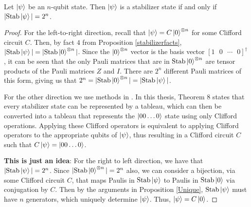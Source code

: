 \documentclass[12pt]{dalthesis}
\begin{document}
\begin{theorem}
\label{stabstate}
Let $\ket{\psi}$ be an $n$-qubit state. Then $\ket{\psi}$ is a stabilizer state if and only if $|\mathrm{Stab} \ket{\psi}| = 2^n$. 
\end{theorem}
\begin{proof}
For the left-to-right direction, recall that $\ket{\psi} = C\ket{0}^{\otimes n}$ for some Clifford circuit $C$. Then, by fact $4$ from Proposition \ref{stabilizerfacts}, $|\mathrm{Stab} \ket{\psi}| = |\mathrm{Stab} \ket{0}^{\otimes n}|$. Since the $\ket{0}^{\otimes n}$ vector is the basis vector $[1 \mbox{ } 0 \mbox{ } \cdots \mbox{ } 0]^\dagger$, it can be seen that the only Pauli matrices that are in $\mathrm{Stab} \ket{0}^{\otimes n}$ are tensor products of the Pauli matrices $Z$ and $I$. There are $2^n$ different Pauli matrices of this form, giving us that $2^n = |\mathrm{Stab} \ket{0}^{\otimes n}| = |\mathrm{Stab} \ket{\psi}|$.



For the other direction we use methods in \cite{Aaronson_2004}. In this thesis,  Theorem 8 states that every stabilizer state can be represented by a tableau, which can then be converted into a tableau that represents the $\ket{00 \dots 0}$ state using only Clifford operations. Applying these Clifford operators is equivalent to applying Clifford operators to the appropriate qubits of $\ket{\psi}$, thus resulting in a Clifford circuit $C$ such that $C\ket{\psi} = \ket{00 \dots 0}$. 

\textbf{This is just an idea}: For the right to left direction, we have that $|\mathrm{Stab}\ket{\psi}| = 2^n$. Since $|\mathrm{Stab}\ket{0}^{\otimes n}| = 2^n$ also, we can consider a bijection, via some Clifford circuit $C$, that maps Paulis in $\mathrm{Stab}\ket{\psi}$ to Paulis in $\mathrm{Stab}\ket{0}$ via conjugation by $C$. Then by the arguments in Proposition \ref{Unique}, $\mathrm{Stab}\ket{\psi}$ must have $n$ generators, which uniquely determine $\ket{\psi}$. Thus, $\ket{\psi} = C\ket{0}$.
\end{proof}
\end{document}
